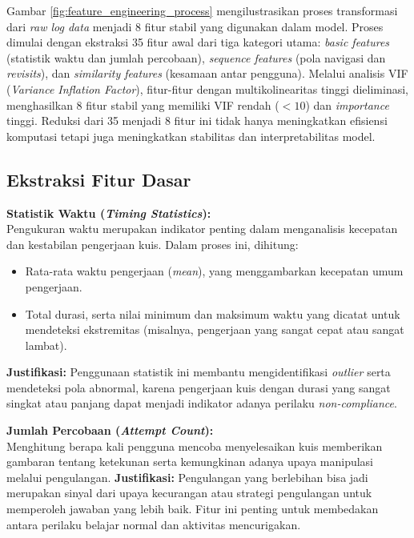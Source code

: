 Gambar \ref{fig:feature_engineering_process} mengilustrasikan proses transformasi dari \textit{raw log data} menjadi 8 fitur stabil yang digunakan dalam model. Proses dimulai dengan ekstraksi 35 fitur awal dari tiga kategori utama: \textit{basic features} (statistik waktu dan jumlah percobaan), \textit{sequence features} (pola navigasi dan \textit{revisits}), dan \textit{similarity features} (kesamaan antar pengguna). Melalui analisis VIF (\textit{Variance Inflation Factor}), fitur-fitur dengan multikolinearitas tinggi dieliminasi, menghasilkan 8 fitur stabil yang memiliki VIF rendah ($<10$) dan \textit{importance} tinggi. Reduksi dari 35 menjadi 8 fitur ini tidak hanya meningkatkan efisiensi komputasi tetapi juga meningkatkan stabilitas dan interpretabilitas model.

\subsection{Ekstraksi Fitur Dasar}
\label{sec:ekstraksiFiturDasar}
\textbf{Statistik Waktu (\textit{Timing Statistics}):} \\
Pengukuran waktu merupakan indikator penting dalam menganalisis kecepatan dan kestabilan pengerjaan kuis. Dalam proses ini, dihitung:
\begin{itemize}
    \item Rata-rata waktu pengerjaan (\textit{mean}), yang menggambarkan kecepatan umum pengerjaan.
    \item Total durasi, serta nilai minimum dan maksimum waktu yang dicatat untuk mendeteksi ekstremitas (misalnya, pengerjaan yang sangat cepat atau sangat lambat).
\end{itemize}
\textbf{Justifikasi:} Penggunaan statistik ini membantu mengidentifikasi \textit{outlier} serta mendeteksi pola abnormal, karena pengerjaan kuis dengan durasi yang sangat singkat atau panjang dapat menjadi indikator adanya perilaku \textit{non-compliance}.

\textbf{Jumlah Percobaan (\textit{Attempt Count}):} \\
Menghitung berapa kali pengguna mencoba menyelesaikan kuis memberikan gambaran tentang ketekunan serta kemungkinan adanya upaya manipulasi melalui pengulangan.
\textbf{Justifikasi:} Pengulangan yang berlebihan bisa jadi merupakan sinyal dari upaya kecurangan atau strategi pengulangan untuk memperoleh jawaban yang lebih baik. Fitur ini penting untuk membedakan antara perilaku belajar normal dan aktivitas mencurigakan.

